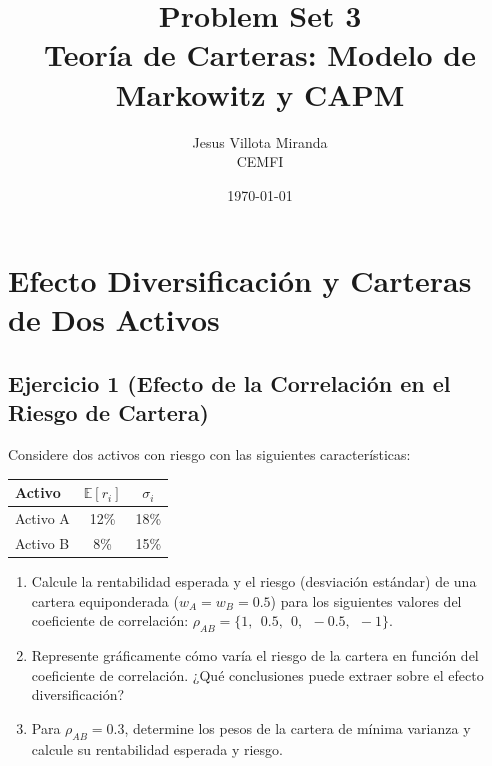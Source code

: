 \documentclass[12pt,a4paper]{article}
\title{\textbf{Problem Set 3}\\\large Teoría de Carteras: Modelo de Markowitz y CAPM}
\author{Jesus Villota Miranda\\CEMFI}
\date{\today}
\newcommand{\E}{\mathbb{E}}
\newenvironment{ejercicio}[1]{\subsection*{Ejercicio #1}}{}
\begin{document}



\section{Efecto Diversificación y Carteras de Dos Activos}

\begin{ejercicio}{1 (Efecto de la Correlación en el Riesgo de Cartera)}
Considere dos activos con riesgo con las siguientes características:
\begin{center}
\begin{tabular}{lcc}
\toprule
Activo & $\E[r_i]$ & $\sigma_i$ \\
\midrule
Activo A & 12\% & 18\% \\
Activo B & 8\% & 15\% \\
\bottomrule
\end{tabular}
\end{center}

\begin{enumerate}[label=\alph*)]
  \item Calcule la rentabilidad esperada y el riesgo (desviación estándar) de una cartera equiponderada ($w_A = w_B = 0.5$) para los siguientes valores del coeficiente de correlación: $\rho_{AB} = \{1, ~~ 0.5, ~~ 0, ~~ -0.5, ~~ -1\}$.
  \item Represente gráficamente cómo varía el riesgo de la cartera en función del coeficiente de correlación. ¿Qué conclusiones puede extraer sobre el efecto diversificación?
  \item Para $\rho_{AB} = 0.3$, determine los pesos de la cartera de mínima varianza y calcule su rentabilidad esperada y riesgo.
\end{enumerate}
\end{ejercicio}
\end{document}
